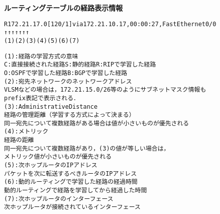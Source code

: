 {\bf ルーティングテーブルの経路表示情報}
\begin{center}
\begin{breakbox}
\begin{alltt}
R       172.21.17.0 [120/1] via 172.21.10.17, 00:00:27, FastEthernet0/0
↑          ↑       ↑ ↑           ↑          ↑          ↑
(1)         (2)     (3) (4)          (5)         (6)         (7)

(1) : 経路の学習方式の意味
          C: 直接接続された経路   S: 静的経路  R: RIPで学習した経路
          O: OSPFで学習した経路   B: BGPで学習した経路
(2) : 宛先ネットワークのネットワークアドレス
          VLSM などの場合は，172.21.15.0/26 等のようにサブネットマスク情報も
          prefix 表記で表示される．
(3) : Administrative Distance
          経路の管理距離（学習する方式によって決まる）
          同一宛先について複数経路がある場合は値が小さいものが優先される
(4) : メトリック
          経路の距離
          同一宛先について複数経路があり，(3) の値が等しい場合は，
          メトリック値が小さいものが優先される
(5) : 次ホップルータの IP アドレス
          パケットを次に転送するべきルータの IP アドレス
(6) : 動的ルーティングで学習した経路の経過時間
          動的ルーティングで経路を学習してから経過した時間
(7) : 次ホップルータのインターフェース
          次ホップルータが接続されているインターフェース
\end{alltt}
\end{breakbox}
\end{center}

\clearpage
